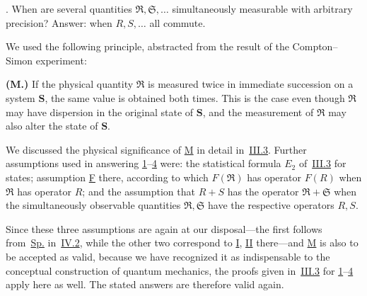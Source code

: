 \documentclass[fontsize=13pt,twoside,openany,headings=normal,parskip=false,bookmarkpackage=false,DIV=calc]{scrbook}
\begin{document}
\noindent{}.\label{criterion:IV.3.4} When are several quantities $\mathfrak R,\mathfrak S,\ldots$ simultaneously measurable with arbitrary precision? Answer: when $R,S,\ldots$ all commute.

We used the following principle, abstracted from the result of the Compton--Simon experiment:

\noindent{}\textbf{(M.)}\label{post:IV.3.M} If the physical quantity $\mathfrak R$ is measured twice in immediate succession on a system $\boldsymbol{S}$, the same value is obtained both times. This is the case even though $\mathfrak R$ may have dispersion in the original state of $\boldsymbol{S}$, and the measurement of $\mathfrak R$ may also alter the state of $\boldsymbol{S}$.

We discussed the physical significance of \hyperref[post:IV.3.M]{M} in detail in~\hyperref[sec:III.3]{III.3}. Further assumptions used in answering \hyperref[criterion:IV.3.1]{1}--\hyperref[criterion:IV.3.4]{4} were: the statistical formula \hyperref[post:III.1.E2]{$E_2$} of~\hyperref[sec:III.3]{III.3} for states; assumption \hyperref[post:III.1.F]{F} there, according to which $F(\mathfrak R)$ has operator $F(R)$ when $\mathfrak R$ has operator $R$; and the assumption that $R+S$ has the operator $\mathfrak R+\mathfrak S$ when the simultaneously observable quantities $\mathfrak R,\mathfrak S$ have the respective operators $R,S$.

Since these three assumptions are again at our disposal---the first follows from~\hyperref[eq:IV.2.Sp]{Sp.} in~\hyperref[sec:IV.2]{IV.2}, while the other two correspond to \hyperref[cond:IV.2.I]{I}, \hyperref[cond:IV.2.II]{II} there---and \hyperref[post:IV.3.M]{M} is also to be accepted as valid, because we have recognized it as indispensable to the conceptual construction of quantum mechanics, the proofs given in~\hyperref[sec:III.3]{III.3} for \hyperref[criterion:IV.3.1]{1}--\hyperref[criterion:IV.3.4]{4} apply here as well. The stated answers are therefore valid again.
\end{document}
